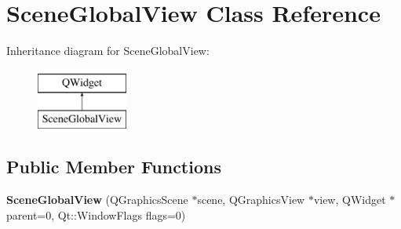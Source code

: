 \hypertarget{class_scene_global_view}{\section{Scene\-Global\-View Class Reference}
\label{class_scene_global_view}
}
Inheritance diagram for Scene\-Global\-View\-:\begin{figure}[H]
\begin{center}
\leavevmode
\includegraphics[height=2.000000cm]{class_scene_global_view}
\end{center}
\end{figure}
\subsection*{Public Member Functions}
\begin{DoxyCompactItemize}
\item 
\hypertarget{class_scene_global_view_ad626e2cbbe86c06bd194fa2abdcabe66}{{\bfseries Scene\-Global\-View} (Q\-Graphics\-Scene $\ast$scene, Q\-Graphics\-View $\ast$view, Q\-Widget $\ast$parent=0, Qt\-::\-Window\-Flags flags=0)}\label{class_scene_global_view_ad626e2cbbe86c06bd194fa2abdcabe66}

\end{DoxyCompactItemize}

